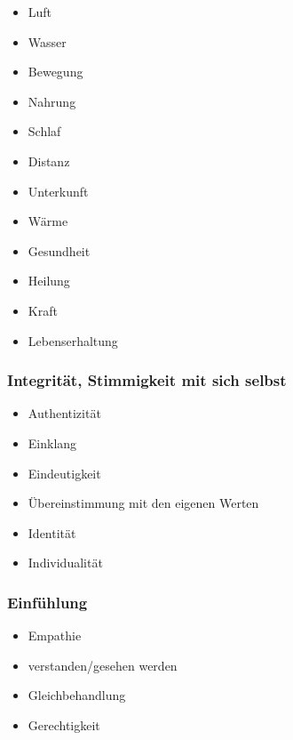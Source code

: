 \begin{multicols}{2}
  \begin{itemize}
    \item Luft
    \item Wasser
    \item Bewegung
    \item Nahrung
    \item Schlaf
    \item Distanz
    \item Unterkunft
    \item Wärme
    \item Gesundheit
    \item Heilung
    \item Kraft
    \item Lebenserhaltung
  \end{itemize}
\end{multicols}


\subsubsection{Integrität, Stimmigkeit mit sich selbst}

\begin{multicols}{2}
  \begin{itemize}
    \item Authentizität
    \item Einklang
    \item Eindeutigkeit
    \item Übereinstimmung mit den eigenen Werten
    \item Identität
    \item Individualität
  \end{itemize}
\end{multicols}


\subsubsection{Einfühlung}

\begin{multicols}{2}
  \begin{itemize}
    \item Empathie
    \item verstanden/gesehen werden
    \item Gleichbehandlung
    \item Gerechtigkeit
  \end{itemize}
\end{multicols}


